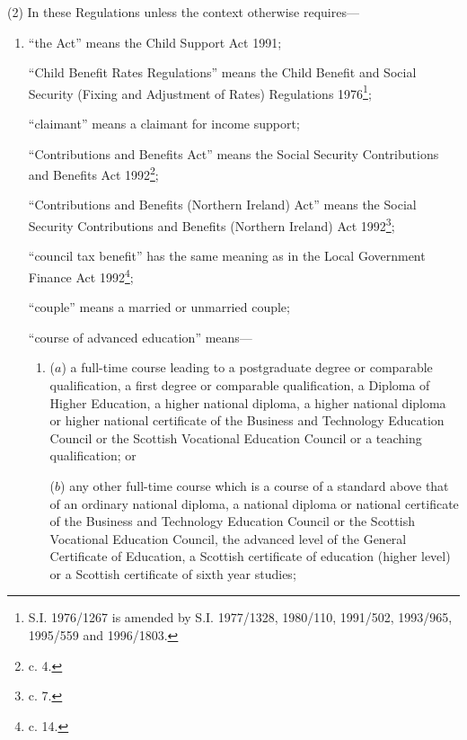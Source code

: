 \documentclass[12pt,a4paper]{article}
\begin{document}
(2) In these Regulations unless the context otherwise requires—
\begin{enumerate}\item[]
“the Act” means the Child Support Act 1991;

“Child Benefit Rates Regulations” means the Child Benefit and Social Security (Fixing and Adjustment of Rates) Regulations 1976\footnote{\frenchspacing S.I. 1976/1267 is amended by S.I. 1977/1328, 1980/110, 1991/502, 1993/965, 1995/559 and 1996/1803.};

“claimant” means a claimant for income support;

“Contributions and Benefits Act” means the Social Security Contributions and Benefits Act 1992\footnote{ c. 4.};

“Contributions and Benefits (Northern Ireland) Act” means the Social Security Contributions and Benefits (Northern Ireland) Act 1992\footnote{ c. 7.};

“council tax benefit” has the same meaning as in the Local Government Finance Act 1992\footnote{ c. 14.};

“couple” means a married or unmarried couple;

“course of advanced education” means---
\begin{enumerate}\item[]
($a$)
a full-time course leading to a postgraduate degree or comparable qualification, a first degree or comparable qualification, a Diploma of Higher Education, a higher national diploma, a higher national diploma or higher national certificate of the Business and 
Technology %
Education Council or the Scottish Vocational Education Council or a teaching qualification; or

($b$)
any other full-time course which is a course of a standard above that of an ordinary national diploma, a national diploma or national certificate of the Business and 
Technology %
Education Council or the Scottish Vocational Education Council, the advanced level of the General Certificate of Education, a Scottish certificate of education (higher level) or a Scottish certificate of sixth year studies;
\end{enumerate}


\end{enumerate}
\end{document}
